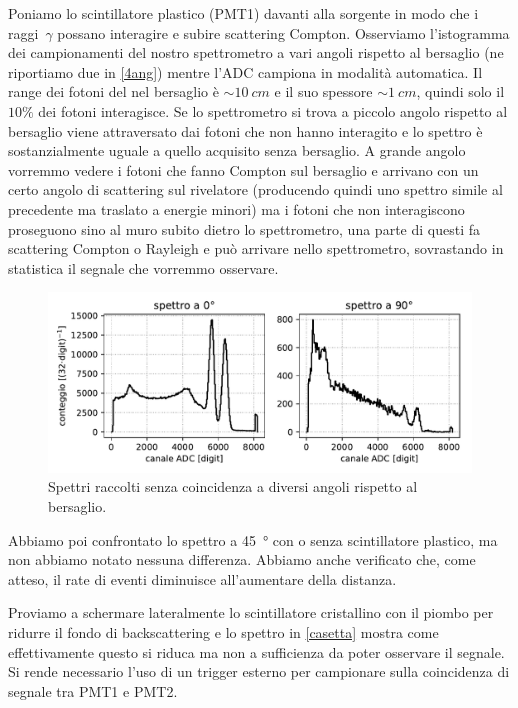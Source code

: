 Poniamo lo scintillatore plastico (PMT1) davanti alla sorgente in modo che i raggi~$\gamma$ possano interagire e subire scattering Compton. Osserviamo l'istogramma dei campionamenti del nostro spettrometro a vari angoli rispetto al bersaglio (ne riportiamo due in \autoref{4ang}) mentre l'ADC campiona in modalità automatica.
Il range dei fotoni del \co\; nel bersaglio è $\sim\SI{10}{cm}$ e il suo spessore $\sim\SI{1}{cm}$, quindi solo il $10\%$ dei fotoni interagisce. 
Se lo spettrometro si trova a piccolo angolo rispetto al bersaglio viene attraversato dai fotoni che non hanno interagito e lo spettro è sostanzialmente uguale a quello acquisito senza bersaglio. A grande angolo vorremmo vedere i fotoni che fanno Compton sul bersaglio e arrivano con un certo angolo di scattering sul rivelatore (producendo quindi uno spettro simile al precedente ma traslato a energie minori) ma i fotoni che non interagiscono proseguono sino al muro subito dietro lo spettrometro, una parte di questi fa scattering Compton o Rayleigh e può arrivare nello spettrometro, sovrastando in statistica il segnale che vorremmo osservare.

\begin{figure}[h]
	\centering
	\includegraphics[width=\textwidth]{plotg}
	\caption{Spettri raccolti senza coincidenza a diversi angoli rispetto al bersaglio.}
	\label{4ang}
\end{figure}

Abbiamo poi confrontato lo spettro a \SI{45}{\degree} con o senza scintillatore plastico, ma non abbiamo notato nessuna differenza. Abbiamo anche verificato che, come atteso, il rate di eventi diminuisce all'aumentare della distanza.

Proviamo a schermare lateralmente lo scintillatore cristallino con il piombo per ridurre il fondo di backscattering e lo spettro in \autoref{casetta} mostra come effettivamente questo si riduca ma non a sufficienza da poter osservare il segnale. Si rende necessario l'uso di un trigger esterno per campionare sulla coincidenza di segnale tra PMT1 e PMT2.

